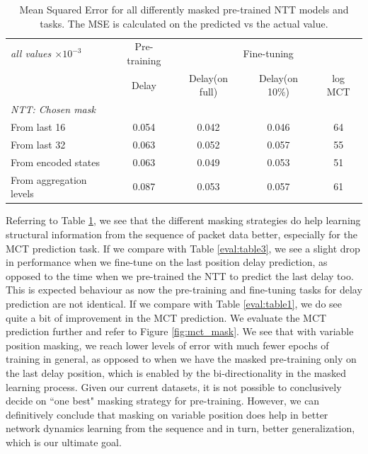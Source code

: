 \begin{table}[htbp]
\centering
\begin{tabular}{ l   c   c  c  c}
\toprule
\emph{all values $\times10^{-3}$} & Pre-training  & \multicolumn{3}{c}{Fine-tuning} \\
\cmidrule{3-5}
                                                       & {Delay}        & {Delay(on full)}  & {Delay(on 10\%)}                           & {log MCT} \\
\midrule
\em{NTT: Chosen mask}                                              & 		 &			  & 						   &          \\
    \smallindent From last 16                                &    0.054            &  0.042  &        0.046                        &    64        \\
    \smallindent From last 32                                & 0.063         & 0.052                   &        0.057  		   &  55        \\
     \smallindent From encoded states        & 0.063          & 0.049              &   0.053             	  &   51        \\
     \smallindent From aggregation levels     & 0.087          & 0.053              &  0.057              & 61       \\

     \bottomrule

\end{tabular}
\caption{Mean Squared Error for all differently masked pre-trained NTT models and tasks. The MSE is calculated on the predicted vs the actual value.}
\label{eval:table4}
\end{table}

Referring to Table \ref{eval:table4}, we see that the different masking strategies do help learning structural information from the sequence of packet data better, especially for the MCT prediction task. If we compare with Table \ref{eval:table3}, we see a slight drop in performance when we fine-tune on the last position delay prediction, as opposed to the time when we pre-trained the NTT to predict the last delay too. This is expected behaviour as now the pre-training and fine-tuning tasks for delay prediction are not identical. If we compare with Table \ref{eval:table1}, we do see quite a bit of improvement in the MCT prediction. We evaluate the MCT prediction further and refer to Figure \ref{fig:mct_mask}. We see that with variable position masking, we reach lower levels of error with much fewer epochs of training in general, as opposed to when we have the masked pre-training only on the last delay position, which is enabled by the bi-directionality in the masked learning process. Given our current datasets, it is not possible to conclusively decide on ``one best" masking strategy for pre-training. However, we can definitively conclude that masking on variable position does help in better network dynamics learning from the sequence and in turn, better generalization, which is our ultimate goal.


